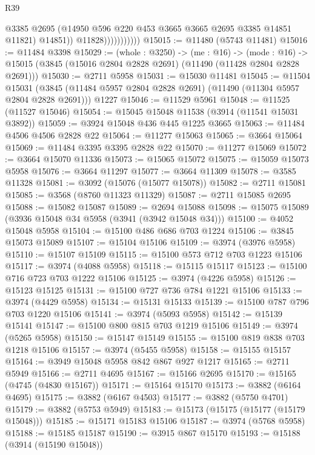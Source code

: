 \begin{lexlean}{R39}
\begin{coremodule}
                              @3385
                              @2695
                              (@14950 @596 @220 @453 @3665 @3665 @2695 @3385 @14851 @11821)
                              @14851))
                          @11828)))))))))))
@15015 := @11480 (@5743 @11481)
@15016 := @11484 @3398
@15029 := (whole : @3250) ->
  (me : @16) ->
  (mode : @16) -> @15015 (@3845 (@15016 @2804 @2828 @2691) (@11490 (@11428 @2804 @2828 @2691)))
@15030 := @2711 @5958
@15031 := @15030 @11481
@15045 := @11504
    @15031
    (@3845 (@11484 @5957 @2804 @2828 @2691) (@11490 (@11304 @5957 @2804 @2828 @2691)))
    @1227
@15046 := @11529 @5961
@15048 := @11525 (@11527 @15046)
@15054 := @15045 @15048 @11538 (@3914 (@11541 @15031 @3892))
@15059 := @3924 @15048 @436 @445 @1225 @3665
@15063 := @11484 @4506 @4506 @2828 @22
@15064 := @11277 @15063
@15065 := @3664 @15064
@15069 := @11484 @3395 @3395 @2828 @22
@15070 := @11277 @15069
@15072 := @3664 @15070 @11336
@15073 := @15065 @15072
@15075 := @15059 @15073 @5958
@15076 := @3664 @11297
@15077 := @3664 @11309
@15078 := @3585 @11328
@15081 := @3092 (@15076 (@15077 @15078))
@15082 := @2711 @15081
@15085 := @3568 (@8760 @11323 @11329)
@15087 := @2711 @15085 @2695
@15088 := @15082 @15087
@15089 := @2694 @15088
@15098 := @15075 @15089 (@3936 @15048 @34 @5958 (@3941 (@3942 @15048 @34)))
@15100 := @4052 @15048 @5958
@15104 := @15100 @486 @686 @703 @1224
@15106 := @3845 @15073 @15089
@15107 := @15104 @15106
@15109 := @3974 (@3976 @5958)
@15110 := @15107 @15109
@15115 := @15100 @573 @712 @703 @1223 @15106
@15117 := @3974 (@4088 @5958)
@15118 := @15115 @15117
@15123 := @15100 @716 @723 @703 @1222 @15106
@15125 := @3974 (@4226 @5958)
@15126 := @15123 @15125
@15131 := @15100 @727 @736 @784 @1221 @15106
@15133 := @3974 (@4429 @5958)
@15134 := @15131 @15133
@15139 := @15100 @787 @796 @703 @1220 @15106
@15141 := @3974 (@5093 @5958)
@15142 := @15139 @15141
@15147 := @15100 @800 @815 @703 @1219 @15106
@15149 := @3974 (@5265 @5958)
@15150 := @15147 @15149
@15155 := @15100 @819 @838 @703 @1218 @15106
@15157 := @3974 (@5455 @5958)
@15158 := @15155 @15157
@15164 := @3949 @15048 @5958 @842 @867 @927 @1217
@15165 := @2711 @5949
@15166 := @2711 @4695
@15167 := @15166 @2695
@15170 := @15165 (@4745 (@4830 @15167))
@15171 := @15164 @15170
@15173 := @3882 (@6164 @4695)
@15175 := @3882 (@6167 @4503)
@15177 := @3882 (@5750 @4701)
@15179 := @3882 (@5753 @5949)
@15183 := @15173 (@15175 (@15177 (@15179 @15048)))
@15185 := @15171 @15183 @15106
@15187 := @3974 (@5768 @5958)
@15188 := @15185 @15187
@15190 := @3915 @867 @15170
@15193 := @15188 (@3914 (@15190 @15048))

\end{coremodule}
\end{lexlean}
